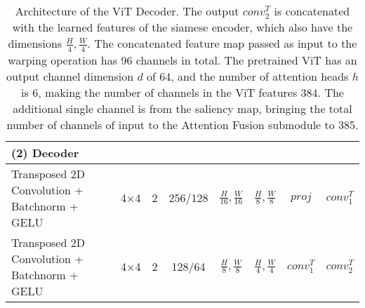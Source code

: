 \begin{table}[htbp]
\begin{adjustbox}{width=1\textwidth}
\begin{tabular}{|l|c|c|c|c|c|c|c|}
\hline
\rowcolor{bgcolor}
\textbf{(2) Decoder}   &                 &                 &                 &                 &                 &                    &                 \\ \hline
\hspace{0.75cm}Transposed 2D Convolution + Batchnorm + GELU              & 4×4               & 2              & 256/128     & \(\frac{H}{16}, \frac{W}{16}\)           & \(\frac{H}{8}, \frac{W}{8}\)           & $proj$   & $conv^T_1$   \\ \hline
\hspace{0.75cm}Transposed 2D Convolution + Batchnorm + GELU              & 4×4              & 2               & 128/64     & \(\frac{H}{8}, \frac{W}{8}\)           & \(\frac{H}{4}, \frac{W}{4}\)           & $conv^T_1$  & $conv^T_2$   \\ \hline
\end{tabular}
\end{adjustbox}
\caption[Architecture of the ViT Decoder.]{Architecture of the ViT Decoder. The output $conv^T_2$ is concatenated with the learned features of the {\mvsn} siamese encoder, which also have the dimensions \(\frac{H}{4}, \frac{W}{4}\). The concatenated feature map passed as input to the warping operation has 96 channels in total. The pretrained ViT has an output channel dimension $d$ of 64, and the number of attention heads $h$ is 6, making the number of channels in the ViT features 384. The additional single channel is from the saliency map, bringing the total number of channels of input to the Attention Fusion submodule to 385.
}
\label{tab:arch-vitdec}
\end{table}